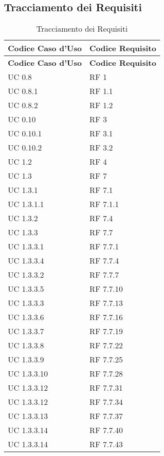 \subsection{Tracciamento dei Requisiti}{ 
\renewcommand*{\arraystretch}{1.4} 
\begin{longtable} [c]{| p{4cm} | p{4cm} |} 
\caption{Tracciamento dei Requisiti \label{tab:traccReq}}\\ \hline\textbf{Codice Caso d'Uso} & \textbf{Codice Requisito} \\ 
\hline \endfirsthead \hline 
\textbf{Codice Caso d'Uso} & \textbf{Codice Requisito} \\ 
\hline \endhead \hline \endfoot \hline \endlastfoot 
UC 0.8 & RF 1\\ 
 \hline 
UC 0.8.1 & RF 1.1\\ 
 \hline 
UC 0.8.2 & RF 1.2\\ 
 \hline 
UC 0.10 & RF 3\\ 
 \hline 
UC 0.10.1 & RF 3.1\\ 
 \hline 
UC 0.10.2 & RF 3.2\\ 
 \hline 
UC 1.2 & RF 4\\ 
 \hline 
UC 1.3 & RF 7\\ 
 \hline 
UC 1.3.1 & RF 7.1\\ 
 \hline 
UC 1.3.1.1 & RF 7.1.1\\ 
 \hline 
UC 1.3.2 & RF 7.4\\ 
 \hline 
UC 1.3.3 & RF 7.7\\ 
 \hline 
UC 1.3.3.1 & RF 7.7.1\\ 
 \hline 
UC 1.3.3.4 & RF 7.7.4\\ 
 \hline 
UC 1.3.3.2 & RF 7.7.7\\ 
 \hline 
UC 1.3.3.5 & RF 7.7.10\\ 
 \hline 
UC 1.3.3.3 & RF 7.7.13\\ 
 \hline 
UC 1.3.3.6 & RF 7.7.16\\ 
 \hline 
UC 1.3.3.7 & RF 7.7.19\\ 
 \hline 
UC 1.3.3.8 & RF 7.7.22\\ 
 \hline 
UC 1.3.3.9 & RF 7.7.25\\ 
 \hline 
UC 1.3.3.10 & RF 7.7.28\\ 
 \hline 
UC 1.3.3.12 & RF 7.7.31\\ 
 \hline 
UC 1.3.3.12 & RF 7.7.34\\ 
 \hline 
UC 1.3.3.13 & RF 7.7.37\\ 
 \hline 
UC 1.3.3.14 & RF 7.7.40\\ 
 \hline 
UC 1.3.3.14 & RF 7.7.43\\ 

\end{longtable}}
